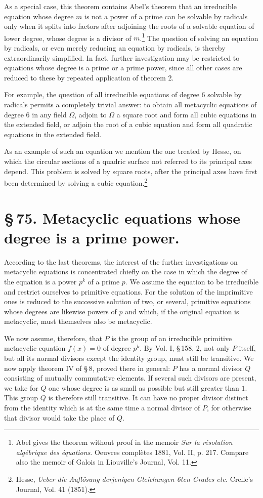 \documentclass[11pt]{article}
\begin{document}
As a special case, this theorem contains Abel's theorem that an irreducible equation whose degree $m$ is not a power of a prime can be solvable by radicals only when it splits into factors after adjoining the roots of a solvable equation of lower degree, whose degree is a divisor of $m$.\footnote{Abel gives the theorem without proof in the memoir \emph{Sur la résolution algébrique des équations}. Oeuvres complètes 1881, Vol. II, p. 217. Compare also the memoir of Galois in Liouville's Journal, Vol. 11.} The question of solving an equation by radicals, or even merely reducing an equation by radicals, is thereby extraordinarily simplified. In fact, further investigation may be restricted to equations whose degree is a prime or a prime power, since all other cases are reduced to these by repeated application of theorem 2.

For example, the question of all irreducible equations of degree $6$ solvable by radicals permits a completely trivial answer: to obtain all metacyclic equations of degree $6$ in any field $\Omega$, adjoin to $\Omega$ a square root and form all cubic equations in the extended field, or adjoin the root of a cubic equation and form all quadratic equations in the extended field.

As an example of such an equation we mention the one treated by Hesse, on which the circular sections of a quadric surface not referred to its principal axes depend. This problem is solved by square roots, after the principal axes have first been determined by solving a cubic equation.\footnote{Hesse, \emph{Ueber die Auflösung derjenigen Gleichungen 6ten Grades etc.} Crelle's Journal, Vol. 41 (1851).}

\section*{\S\,75. Metacyclic equations whose degree is a prime power.}

According to the last theorems, the interest of the further investigations on metacyclic equations is concentrated chiefly on the case in which the degree of the equation is a power $p^k$ of a prime $p$. We assume the equation to be irreducible and restrict ourselves to primitive equations. For the solution of the imprimitive ones is reduced to the successive solution of two, or several, primitive equations whose degrees are likewise powers of $p$ and which, if the original equation is metacyclic, must themselves also be metacyclic.

We now assume, therefore, that $P$ is the group of an irreducible primitive metacyclic equation $f(x)=0$ of degree $p^k$. By Vol. I, \S\,158, 2, not only $P$ itself, but all its normal divisors except the identity group, must still be transitive. We now apply theorem IV of \S\,8, proved there in general: $P$ has a normal divisor $Q$ consisting of mutually commutative elements. If several such divisors are present, we take for $Q$ one whose degree is as small as possible but still greater than $1$. This group $Q$ is therefore still transitive. It can have no proper divisor distinct from the identity which is at the same time a normal divisor of $P$, for otherwise that divisor would take the place of $Q$.
\end{document}
